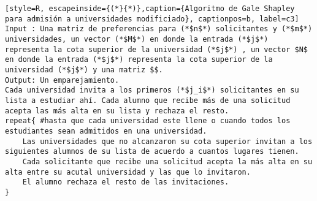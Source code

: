  \begin{lstlisting}[style=R, escapeinside={(*}{*)},caption={Algoritmo de Gale Shapley para admisión a universidades modificiado}, captionpos=b, label=c3]
Input : Una matriz de preferencias para (*$n$*) solicitantes y (*$m$*) universidades, un vector (*$M$*) en donde la entrada (*$j$*) representa la cota superior de la universidad (*$j$*) , un vector $N$ en donde la entrada (*$j$*) representa la cota superior de la universidad (*$j$*) y una matriz $$.
Output: Un emparejamiento. 
Cada universidad invita a los primeros (*$j_i$*) solicitantes en su lista a estudiar ahí. Cada alumno que recibe más de una solicitud acepta las más alta en su lista y rechaza el resto. 
repeat{ #hasta que cada universidad este llene o cuando todos los estudiantes sean admitidos en una universidad.
	Las universidades que no alcanzaron su cota superior invitan a los siguientes alumnos de su lista de acuerdo a cuantos lugares tienen.
	Cada solicitante que recibe una solicitud acepta la más alta en su alta entre su acutal universidad y las que lo invitaron. 
	El alumno rechaza el resto de las invitaciones.
}
\end{lstlisting}



